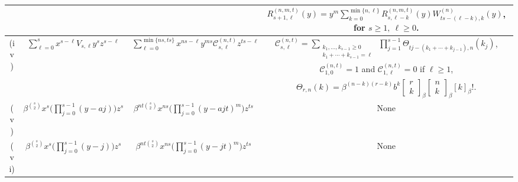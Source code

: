 \documentclass{amsart}
\theoremstyle{definition}
\theoremstyle{remark}
\numberwithin{equation}{section}
\begin{document}
\begin{table}[H]
{\begin{tabular}{ |c|c|c|c| }
& & & $R^{(n,m,t)}_{s+1,\ell}(y) = y^{m}\displaystyle\sum_{k=0}^{\min\{n,\ell\}}
R^{(n,m,t)}_{s,\ell-k}(y)W^{(n)}_{ts-(\ell-k),k}(y)$, for $s\ge 1,\ \ell\ge 0$. \\
\hline
\multirow{3}{*}{(iv)} & \multirow{3}{*}{$\displaystyle\sum_{\ell=0}^{s} x^{s-\ell}V_{s,\ell}y^{s}z^{s-\ell}$} & \multirow{3}{*}{$\displaystyle\sum_{\ell=0}^{\min\{ns,ts\}}
x^{ns-\ell}y^{ms}\mathcal C^{(n,t)}_{s,\ell}z^{ts-\ell}$} & $\mathcal C^{(n,t)}_{s,\ell}=\displaystyle\sum_{\substack{k_1,\dots,k_{s-1}\ge 0\\ k_1+\cdots+k_{s-1}=\ell}}
\ \prod_{j=1}^{s-1}\Theta_{tj-(k_1+\cdots+k_{j-1}),n}(k_j)$,  \\ 
& & & $\mathcal C^{(n,t)}_{1,0}=1$ and $\mathcal C^{(n,t)}_{1,\ell}=0$ if $\ell\ge 1$, \\
& & & $\Theta_{r,n}(k)=\beta^{(n-k)(r-k)} b^{k}
\begin{bmatrix}r\\ k\end{bmatrix}_{\beta}\begin{bmatrix}n\\ k\end{bmatrix}_{\beta}[k]_{\beta}!$. \\
\hline
(v) & $\beta^{\binom{s}{2}}x^{s}\Big(\displaystyle\prod_{j=0}^{s-1}(y-aj)\Big)z^{s}$ & $\beta^{nt\binom{s}{2}}x^{ns}\Big(\displaystyle\prod_{j=0}^{s-1}(y-ajt)^m\Big)z^{ts}$ & None  \\ 
\hline
(vi) & $\beta^{\binom{s}{2}}x^{s}\Big(\displaystyle\prod_{j=0}^{s-1}(y-j)\Big)z^{s}$ & $\beta^{nt\binom{s}{2}}x^{ns}\Big(\displaystyle\prod_{j=0}^{s-1}(y-jt)^m\Big)z^{ts}$ &  None \\ 
\hline
\end{tabular}
}
\end{table}
\end{document}
